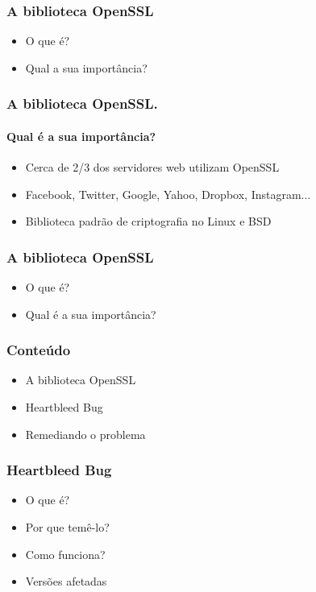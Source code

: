 \documentclass{beamer}
\begin{document}
\begin{frame}
	\frametitle{A biblioteca OpenSSL}
	\begin{itemize}
		\item \textcolor{covered}{O que é?}
		\item Qual a sua importância?
	\end{itemize}
\end{frame}

\begin{frame}
	\frametitle{A biblioteca OpenSSL.}
	\framesubtitle{Qual é a sua importância?}
	\begin{itemize}
		\item Cerca de 2/3 dos servidores web utilizam OpenSSL
		\item Facebook, Twitter, Google, Yahoo, Dropbox, Instagram...
		\item Biblioteca padrão de criptografia no Linux e BSD
	\end{itemize}
\end{frame}

\begin{frame}
	\frametitle{A biblioteca OpenSSL}
	\begin{itemize}
		\item \textcolor{covered}{O que é?}
		\item \textcolor{covered}{Qual é a sua importância?}
	\end{itemize}
\end{frame}

\begin{frame}
	\frametitle{Conteúdo}
	\begin{itemize}
		\item \textcolor{covered}{A biblioteca OpenSSL}
		\item Heartbleed Bug
		\item Remediando o problema
	\end{itemize}
\end{frame}

\begin{frame}
	\frametitle{Heartbleed Bug}
	\begin{itemize}
		\item O que é?
		\item Por que temê-lo?
		\item Como funciona?
		\item Versões afetadas
	\end{itemize}
\end{frame}
\end{document}
